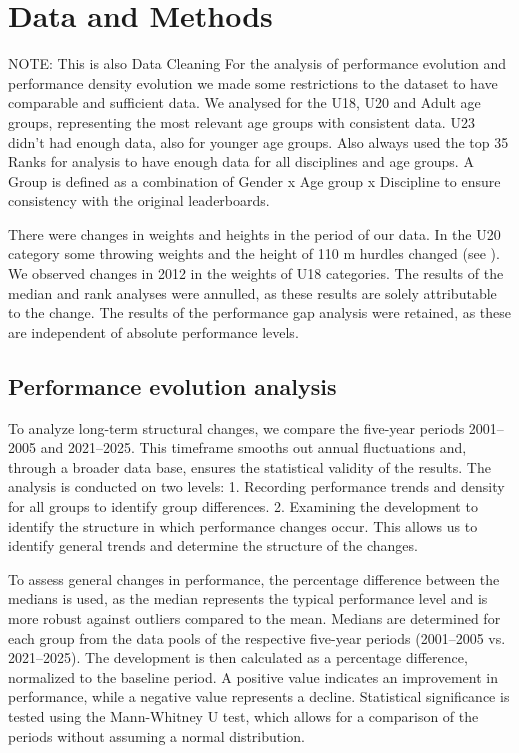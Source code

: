 \documentclass{article}
\begin{document}


\section{Data and Methods}\label{sec:methods}
NOTE: This is also Data Cleaning
For the analysis of performance evolution and performance density evolution we made some restrictions to the dataset to have comparable and sufficient data.
We analysed for the U18, U20 and Adult age groups, representing the most relevant age groups with consistent data. U23 didn't had enough data, also for younger age groups.
Also always used the top 35 Ranks for analysis to have enough data for all disciplines and age groups.
A Group is defined as a combination of Gender x Age group x Discipline to ensure consistency with the original leaderboards.

There were changes in weights and heights in the period of our data. In the U20 category some throwing weights and the height of 110 m hurdles changed (see \citep{ProgressionWorldAthletics}). We observed changes in 2012 in the weights of U18 categories. The results of the median and rank analyses were annulled, as these results are solely attributable to the change. The results of the performance gap analysis were retained, as these are independent of absolute performance levels.

\subsection{Performance evolution analysis}

To analyze long-term structural changes, we compare the five-year periods 2001–2005 and 2021–2025. This timeframe smooths out annual fluctuations and, through a broader data base, ensures the statistical validity of the results.
The analysis is conducted on two levels: 1. Recording performance trends and density for all groups to identify group differences. 2. Examining the development to identify the structure in which performance changes occur.
This allows us to identify general trends and determine the structure of the changes.

To assess general changes in performance, the percentage difference between the medians is used, as the median represents the typical performance level and is more robust against outliers compared to the mean. Medians are determined for each group from the data pools of the respective five-year periods (2001–2005 vs. 2021–2025). The development is then calculated as a percentage difference, normalized to the baseline period. A positive value indicates an improvement in performance, while a negative value represents a decline. Statistical significance is tested using the Mann-Whitney U test, which allows for a comparison of the periods without assuming a normal distribution.
\end{document}
